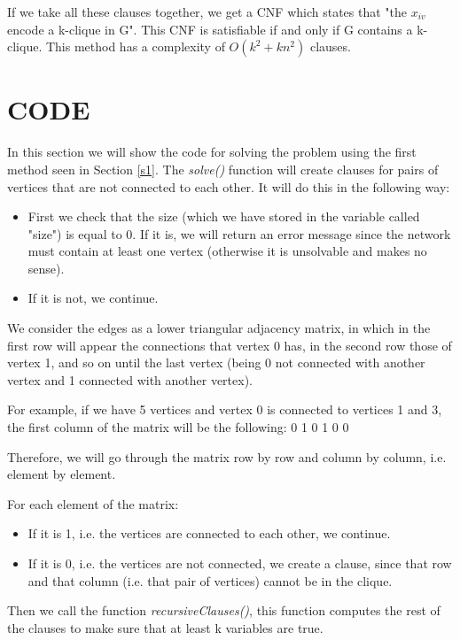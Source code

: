 \documentclass[table]{article}
\begin{document}
If we take all these clauses together, we get a CNF which states that "the $x_{iv}$ encode a k-clique in G". This CNF is satisfiable if and only if G contains a k-clique.
This method has a complexity of $O(k^2+kn^2)$ clauses.

\section{CODE}
In this section we will show the code for solving the problem using the first method seen in Section \ref{s1}.
The \textit{solve()} function will create clauses for pairs of vertices that are not connected to each other. It will do this in the following way:

\begin{itemize}
\item First we check that the size (which we have stored in the variable called "size") is equal to 0. If it is, we will return an error message since the network must contain at least one vertex (otherwise it is unsolvable and makes no sense).
\item If it is not, we continue.
\end{itemize}
We consider the edges as a lower triangular adjacency matrix, in which in the first row will appear the connections that vertex 0 has, in the second row those of vertex 1, and so on until the last vertex (being 0 not connected with another vertex and 1 connected with another vertex).\newline

For example, if we have 5 vertices and vertex 0 is connected to vertices 1 and 3, the first column of the matrix will be the following: 0 1 0 1 0 0

Therefore, we will go through the matrix row by row and column by column, i.e. element by element. 

For each element of the matrix:

\begin{itemize}
\item If it is 1, i.e. the vertices are connected to each other, we continue.
\item If it is 0, i.e. the vertices are not connected, we create a clause, since that row and that column (i.e. that pair of vertices) cannot be in the clique.
\end{itemize}

\leftskip=0.5in
Then we call the function \textit{recursiveClauses()}, this function computes the rest of the clauses to make sure that at least k variables are true.
\end{document}
